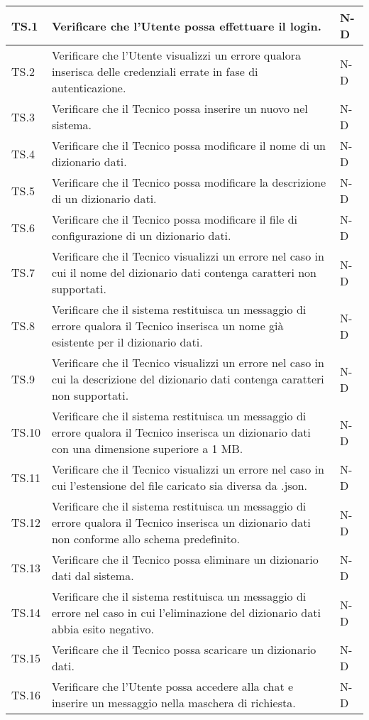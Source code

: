 \begin{adjustwidth}{-0.5cm}{-0.5cm}
\begin{longtable}{|P{1.5cm}|>{\raggedright}P{9.5cm}|>{\arraybackslash}P{1.5cm}|}
		TS.1 & Verificare che l'Utente possa effettuare il login. & N-D \\
		\hline TS.2 & Verificare che l'Utente visualizzi un errore qualora inserisca delle credenziali errate in fase di autenticazione. & N-D \\
		\hline TS.3 & Verificare che il Tecnico possa inserire un nuovo  nel sistema. & N-D \\ 
		\hline TS.4 & Verificare che il Tecnico possa modificare il nome di un dizionario dati. & N-D \\ 
		\hline TS.5 & Verificare che il Tecnico possa modificare la descrizione di un dizionario dati. & N-D \\
		\hline TS.6 & Verificare che il Tecnico possa modificare il file di configurazione di un dizionario dati. & N-D \\
		\hline TS.7 & Verificare che il Tecnico visualizzi un errore nel caso in cui il nome del dizionario dati contenga caratteri non supportati. & N-D \\ 
		\hline TS.8 & Verificare che il sistema restituisca un messaggio di errore qualora il Tecnico inserisca un nome già esistente per il dizionario dati. & N-D \\ 
		\hline TS.9 & Verificare che il Tecnico visualizzi un errore nel caso in cui la descrizione del dizionario dati contenga caratteri non supportati. & N-D \\ 
		\hline TS.10 & Verificare che il sistema restituisca un messaggio di errore qualora il Tecnico inserisca un dizionario dati con una dimensione superiore a 1 MB. & N-D \\
		\hline TS.11 & Verificare che il Tecnico visualizzi un errore nel caso in cui l'estensione del file caricato sia diversa da .json. & N-D \\ 
		\hline TS.12 & Verificare che il sistema restituisca un messaggio di errore qualora il Tecnico inserisca un dizionario dati non conforme allo schema predefinito. & N-D \\  
		\hline TS.13 & Verificare che il Tecnico possa eliminare un dizionario dati dal sistema. & N-D \\ 
		\hline TS.14 & Verificare che il sistema restituisca un messaggio di errore nel caso in cui l'eliminazione del dizionario dati abbia esito negativo. & N-D \\  
		\hline TS.15 & Verificare che il Tecnico possa scaricare un dizionario dati. & N-D \\
		\hline TS.16 & Verificare che l'Utente possa accedere alla chat e inserire un messaggio nella maschera di richiesta. & N-D \\   

\end{longtable}
\end{adjustwidth}

